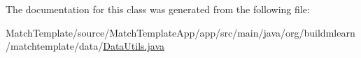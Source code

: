 The documentation for this class was generated from the following file\+:\begin{DoxyCompactItemize}
\item 
Match\+Template/source/\+Match\+Template\+App/app/src/main/java/org/buildmlearn/matchtemplate/data/\hyperlink{MatchTemplate_2source_2MatchTemplateApp_2app_2src_2main_2java_2org_2buildmlearn_2matchtemplate_2data_2DataUtils_8java}{Data\+Utils.\+java}\end{DoxyCompactItemize}
